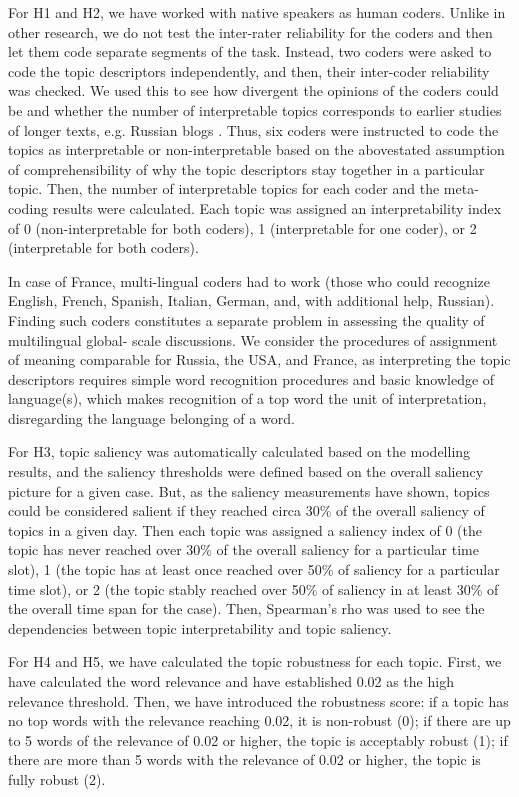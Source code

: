 For H1 and H2, we have worked with native speakers as human coders. Unlike in other research, we do not test the inter-rater reliability for the coders and then let them code separate segments of the task. Instead, two coders were asked to code the topic descriptors independently, and then, their inter-coder reliability was checked. We used this to see how divergent the opinions of the coders could be and whether the number of interpretable topics corresponds to earlier studies of longer texts, e.g. Russian blogs \cite{KoltsovaKoltcov}. Thus, six coders were instructed to code the topics as interpretable or non-interpretable based on the abovestated assumption of comprehensibility of why the topic descriptors stay together in a particular topic. Then, the number of interpretable topics for each coder and the meta-coding results were calculated. Each topic was assigned an interpretability index of 0 (non-interpretable for both coders), 1 (interpretable for one coder), or 2 (interpretable for both coders).

In case of France, multi-lingual coders had to work (those who could recognize English, French, Spanish, Italian, German, and, with additional help, Russian). Finding such coders constitutes a separate problem in assessing the quality of multilingual global- scale discussions. We consider the procedures of assignment of meaning comparable for Russia, the USA, and France, as interpreting the topic descriptors requires simple word recognition procedures and basic knowledge of language(s), which makes recognition of a top word the unit of interpretation, disregarding the language belonging of a word.

For H3, topic saliency was automatically calculated based on the modelling results, and the saliency thresholds were defined based on the overall saliency picture for a given case. But, as the saliency measurements have shown, topics could be considered salient if they reached circa 30\% of the overall saliency of topics in a given day. Then each topic was assigned a saliency index of 0 (the topic has never reached over 30\% of the overall saliency for a particular time slot), 1 (the topic has at least once reached over 50\% of saliency for a particular time slot), or 2 (the topic stably reached over 50\% of saliency in at least 30\% of the overall time span for the case). Then, Spearman’s rho was used to see the dependencies between topic interpretability and topic saliency.

For H4 and H5, we have calculated the topic robustness for each topic. First, we have calculated the word relevance and have established 0.02 as the high relevance threshold. Then, we have introduced the robustness score: if a topic has no top words with the relevance reaching 0.02, it is non-robust (0); if there are up to 5 words of the relevance of 0.02 or higher, the topic is acceptably robust (1); if there are more than 5 words with the relevance of 0.02 or higher, the topic is fully robust (2).

